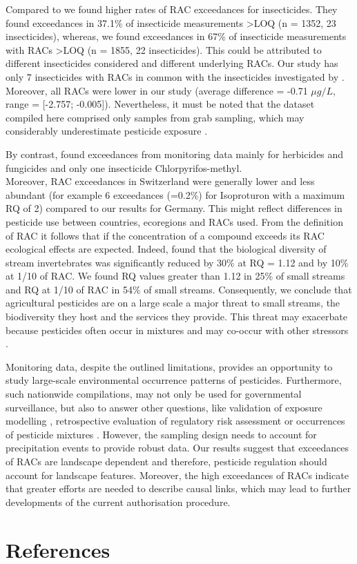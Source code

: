 Compared to \citet{stehle_pesticide_2015} we found higher rates of RAC exceedances for insecticides.
They found exceedances in 37.1\% of insecticide measurements \textgreater LOQ (n = 1352, 23 insecticides), whereas, we found exceedances in 67\% of insecticide measurements with RACs \textgreater LOQ (n = 1855, 22 insecticides). 
This could be attributed to different insecticides considered and different underlying RACs.
Our study has only 7 insecticides with RACs in common with the insecticides investigated by \citet{stehle_pesticide_2015}.
Moreover, all RACs were lower in our study (average difference = -0.71 $\mu g/L$, range = [-2.757; -0.005]). 
Nevertheless, it must be noted that the dataset compiled here comprised only samples from grab sampling, which may considerably underestimate pesticide exposure \citep{stehle_probabilistic_2013, Xing_Chow_Rees_Meng_Li_Ernst_Benoy_Zha_Hewitt_2013}. 


By contrast, \citet{knauer_pesticides_2016} found exceedances from monitoring data mainly for herbicides and fungicides and only one insecticide Chlorpyrifos\--methyl. \\
More\-over, RAC exceedances in Switzerland were generally lower and less abundant (for example 6 exceedances (=0.2\%) for Isoproturon with a maximum RQ of 2) compared to our results for Germany. 
This might reflect differences in pesticide use between countries, ecoregions and RACs used. 
From the definition of RAC it follows that if the concentration of a compound exceeds its RAC ecological effects are expected.
Indeed, \citet{stehle_agricultural_2015} found that the biological diversity of stream invertebrates was significantly reduced by 30\% at RQ = 1.12 and by 10\% at 1/10 of RAC.
We found RQ values greater than 1.12 in 25\% of small streams and RQ at 1/10 of RAC in 54\% of small streams. 
Consequently, we conclude that agricultural pesticides are on a large scale a major threat to small streams, the biodiversity they host and the services they provide. 
This threat may exacerbate because pesticides often occur in mixtures \citep{schreiner_pesticide_2016} and may co-occur with other stressors \citep{schafer_contribution_2016}. 

Monitoring data, despite the outlined limitations, provides an opportunity to study large-scale environmental occurrence patterns of pesticides.
Furthermore, such nationwide compilations, may not only be used for governmental surveillance, but also to answer other questions, like validation of exposure modelling \citep{knabel_fungicide_2014}, retrospective evaluation of regulatory risk assessment \citep{knauer_pesticides_2016,stehle_pesticide_2015}or occurrences of pesticide mixtures \citep{schreiner_pesticide_2016}.
However, the sampling design needs to account for precipitation events to provide robust data. 
Our results suggest that exceedances of RACs are landscape dependent %
and therefore, pesticide regulation should account for landscape features. 
Moreover, the high exceedances of RACs indicate that greater efforts are needed to describe causal links, which may lead to further developments of the current authorisation procedure.

\section{References}
\printbibliography[heading=none]
